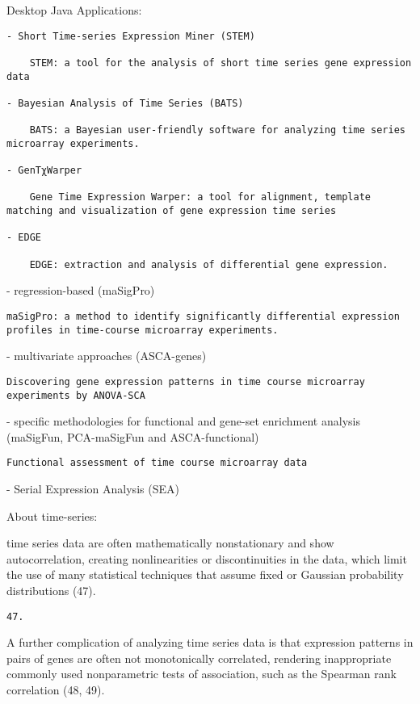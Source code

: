 \documentclass[
]{book}
\begin{document}
Desktop Java Applications:

\begin{verbatim}
- Short Time-series Expression Miner (STEM)

    STEM: a tool for the analysis of short time series gene expression data

- Bayesian Analysis of Time Series (BATS)

    BATS: a Bayesian user-friendly software for analyzing time series microarray experiments.

- GenTχWarper

    Gene Time Expression Warper: a tool for alignment, template matching and visualization of gene expression time series

- EDGE

    EDGE: extraction and analysis of differential gene expression.
\end{verbatim}

- regression-based (maSigPro)

\begin{verbatim}
maSigPro: a method to identify significantly differential expression profiles in time-course microarray experiments.
\end{verbatim}

- multivariate approaches (ASCA-genes)

\begin{verbatim}
Discovering gene expression patterns in time course microarray experiments by ANOVA-SCA
\end{verbatim}

- specific methodologies for functional and gene-set enrichment analysis (maSigFun, PCA-maSigFun and ASCA-functional)

\begin{verbatim}
Functional assessment of time course microarray data
\end{verbatim}

- Serial Expression Analysis (SEA)

About time-series:

time series data are often mathematically nonstationary and show autocorrelation, creating nonlinearities or discontinuities in the data, which limit the use of many statistical techniques that assume fixed or Gaussian probability distributions (47).

\begin{verbatim}
47.
\end{verbatim}

A further complication of analyzing time series data is that expression patterns in pairs of genes are often not monotonically correlated, rendering inappropriate commonly used nonparametric tests of association, such as the Spearman rank correlation (48, 49).
\end{document}
